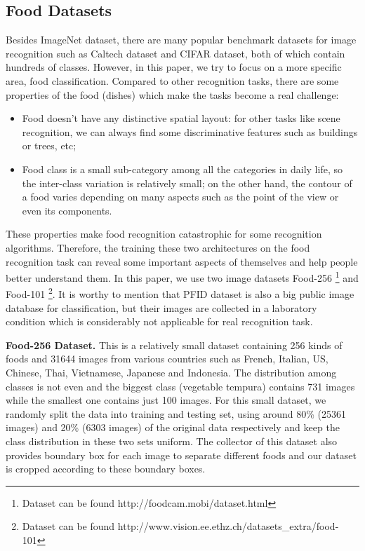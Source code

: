 \subsection{Food Datasets}
Besides ImageNet dataset, there are many popular benchmark datasets for image recognition such as Caltech dataset and CIFAR dataset, both of which contain hundreds of classes. However, in this paper, we try to focus on a more specific area, food classification. Compared to other recognition tasks, there are some properties of the food (dishes) which make the tasks become a real challenge:
\begin{itemize}
  \item Food doesn't have any distinctive spatial layout: for other tasks like scene recognition, we can always find some discriminative features such as buildings or trees, etc;
  \item Food class is a small sub-category among all the categories in daily life, so the inter-class variation is relatively small; on the other hand, the contour of a food varies depending on many aspects such as the point of the view or even its components.
\end{itemize}
These properties make food recognition catastrophic for some recognition algorithms. Therefore, the training these two architectures on the food recognition task can reveal some important aspects of themselves and help people better understand them. In this paper, we use two image datasets Food-256 \cite{kawano14c}\footnote{Dataset can be found http://foodcam.mobi/dataset.html} and Food-101 \cite{bossard2014food}\footnote{Dataset can be found http://www.vision.ee.ethz.ch/datasets\_extra/food-101}. It is worthy to mention that PFID dataset is also a big public image database for classification, but their images are collected in a laboratory condition which is considerably not applicable for real recognition task.

\textbf{Food-256 Dataset.}
This is a relatively small dataset containing 256 kinds of foods and 31644 images from various countries such as French, Italian, US, Chinese, Thai, Vietnamese, Japanese and Indonesia. The distribution among classes is not even and the biggest class (vegetable tempura) contains 731 images while the smallest one contains just 100 images. For this small dataset, we randomly split the data into training and testing set, using around 80\% (25361 images) and 20\% (6303 images) of the original data respectively and keep the class distribution in these two sets uniform. The collector of this dataset also provides boundary box for each image to separate different foods and our dataset is cropped according to these boundary boxes.

